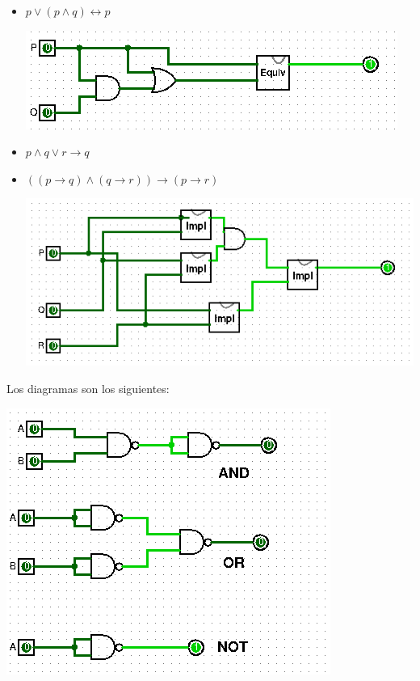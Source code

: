 \documentclass[answers]{exam}
\begin{document}
\begin{questions}
\begin{solution}
\begin{itemize}
\begin{center}
            \end{center}
      \item $p \lor (p \land q) \leftrightarrow p$
            \begin{center}
              \includegraphics[scale=0.9]{ejercicio1.2}
            \end{center}
      \item $p \land q \lor r \to q$
      \item $((p \to q) \land (q \to r)) \to (p \to r)$
            \begin{center}
              \includegraphics[scale=0.9]{ejercicio1.4}
            \end{center}
    \end{itemize}
  \end{solution}

  \begin{solution}
    Los diagramas son los siguientes:
    \begin{center}
      \includegraphics[scale=0.8]{ejercicio2}
    \end{center}
  \end{solution}


\end{questions}
\end{document}
